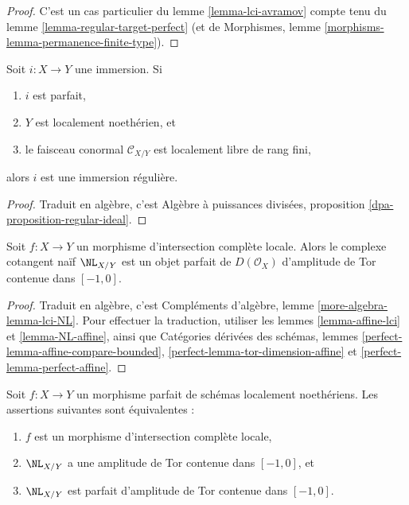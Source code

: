 \begin{proof}
C'est un cas particulier du lemme \ref{lemma-lci-avramov}
compte tenu du lemme \ref{lemma-regular-target-perfect}
(et de Morphismes, lemme \ref{morphisms-lemma-permanence-finite-type}).
\end{proof}

\begin{lemma}
\label{lemma-perfect-conormal-free-lci}
Soit $i : X \to Y$ une immersion. Si
\begin{enumerate}
\item $i$ est parfait,
\item $Y$ est localement noethérien, et
\item le faisceau conormal $\mathcal{C}_{X/Y}$ est localement libre de rang fini,
\end{enumerate}
alors $i$ est une immersion régulière.
\end{lemma}

\begin{proof}
Traduit en algèbre, c'est
Algèbre à puissances divisées, proposition \ref{dpa-proposition-regular-ideal}.
\end{proof}

\begin{lemma}
\label{lemma-lci-NL}
Soit $f : X \to Y$ un morphisme d'intersection complète locale.
Alors le complexe cotangent naïf $\NL_{X/Y}$ est un objet parfait
de $D(\mathcal{O}_X)$ d'amplitude de Tor contenue dans $[-1, 0]$.
\end{lemma}

\begin{proof}
Traduit en algèbre, c'est
Compléments d'algèbre, lemme \ref{more-algebra-lemma-lci-NL}.
Pour effectuer la traduction, utiliser
les lemmes \ref{lemma-affine-lci} et
\ref{lemma-NL-affine}, ainsi que
Catégories dérivées des schémas, lemmes
\ref{perfect-lemma-affine-compare-bounded},
\ref{perfect-lemma-tor-dimension-affine} et
\ref{perfect-lemma-perfect-affine}.
\end{proof}

\begin{lemma}
\label{lemma-perfect-NL-lci}
Soit $f : X \to Y$ un morphisme parfait de schémas localement noethériens.
Les assertions suivantes sont équivalentes :
\begin{enumerate}
\item $f$ est un morphisme d'intersection complète locale,
\item $\NL_{X/Y}$ a une amplitude de Tor contenue dans $[-1, 0]$, et
\item $\NL_{X/Y}$ est parfait d'amplitude de Tor contenue dans $[-1, 0]$.
\end{enumerate}
\end{lemma}

